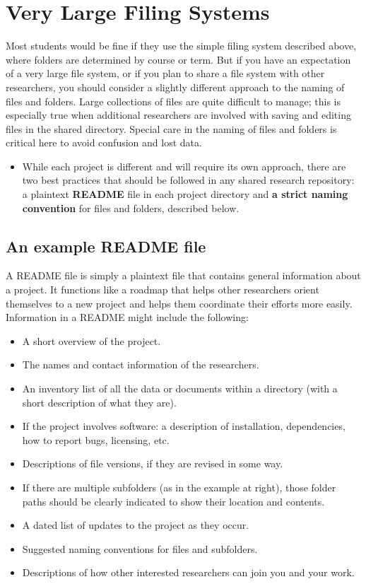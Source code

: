 \section{Very Large Filing Systems}

Most students would be fine if they use the simple filing system described above, where folders are determined by course or term. But if you have an expectation of a very large file system, or if you plan to share a file system with other researchers, you should consider a slightly different approach to the naming of files and folders. Large collections of files are quite difficult to manage; this is especially true when additional researchers are involved with saving and editing files in the shared directory. Special care in the naming of files and folders is critical here to avoid confusion and lost data. 

\begin{itemize}
\item While each project is different and will require its own approach, there are two best practices that should be followed in any shared research repository: a plaintext \textbf{README} file in each project directory and \textbf{a strict naming convention} for files and folders, described below.  
\end{itemize}

\subsection{An example README file}

A README file is simply a plaintext file that contains general information about a project. It functions like a roadmap that helps other researchers orient themselves to a new project and helps them coordinate their efforts more easily.  Information in a README might include the following:

\begin{itemize}
\item A short overview of the project.
\item The names and contact information of the researchers.
\item An inventory list of all the data or documents within a directory (with a short description of what they are). 
\item If the project involves software: a description of installation, dependencies, how to report bugs, licensing, etc.
\item Descriptions of file versions, if they are revised in some way.
\item If there are multiple subfolders (as in the example at right), those folder paths should be clearly indicated to show their location and contents.
\item A dated list of updates to the project as they occur. 
\item Suggested naming conventions for files and subfolders.
\item Descriptions of how other interested researchers can join you and your work.

\end{itemize}

